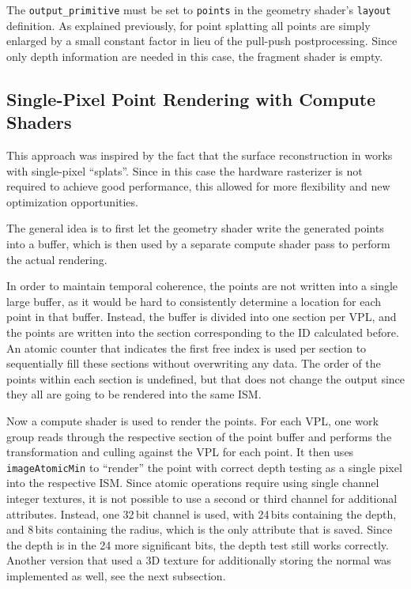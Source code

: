 The \texttt{output\_primitive} must be set to \texttt{points} in the geometry shader's \texttt{layout} definition. As explained previously, for point splatting all points are simply enlarged by a small constant factor in lieu of the pull-push postprocessing. Since only depth information are needed in this case, the fragment shader is empty.



\subsection{Single-Pixel Point Rendering with Compute Shaders}
\label{sec:impl:singlePixelRendering}

This approach was inspired by the fact that the surface reconstruction in \citet{Marroquim:2007:reconstruction} works with single-pixel ``splats''. Since in this case the hardware rasterizer is not required to achieve good performance, this allowed for more flexibility and new optimization opportunities.

The general idea is to first let the geometry shader write the generated points into a buffer, which is then used by a separate compute shader pass to perform the actual rendering.

In order to maintain temporal coherence, the points are not written into a single large buffer, as it would be hard to consistently determine a location for each point in that buffer. Instead, the buffer is divided into one section per VPL, and the points are written into the section corresponding to the ID calculated before. An atomic counter that indicates the first free index is used per section to sequentially fill these sections without overwriting any data. The order of the points within each section is undefined, but that does not change the output since they all are going to be rendered into the same ISM.

Now a compute shader is used to render the points. For each VPL, one work group reads through the respective section of the point buffer and performs the transformation and culling against the VPL for each point. It then uses \texttt{imageAtomicMin} to ``render'' the point with correct depth testing as a single pixel into the respective ISM. Since atomic operations require using single channel integer textures, it is not possible to use a second or third channel for additional attributes. Instead, one 32\,bit channel is used, with 24\,bits containing the depth, and 8\,bits containing the radius, which is the only attribute that is saved. Since the depth is in the 24 more significant bits, the depth test still works correctly. Another version that used a 3D texture for additionally storing the normal was implemented as well, see the next subsection.

